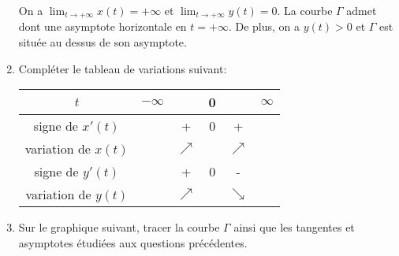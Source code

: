 \documentclass[a4paper]{tp_um}
\begin{document}
\begin{enumerate}
            On a $\lim_{t\to +\infty} x(t) = +\infty$ et $\lim_{t\to +\infty} y(t) = 0 $. La courbe $\Gamma$ admet dont une asymptote horizontale en $t=+\infty$. De plus, on a $y(t) >0$ et $\Gamma$ est située au dessus de son asymptote.
		\item Compléter le tableau de variations suivant:
			\begin{center}
				\begin{tabular}{|c|ccccc|}
					\hline    $t$       & $-\infty$ & \hspace{5cm}   &  0 &  \hspace{5cm} & $\infty$ \\[0.3cm]\hline\hline
					signe de $x'(t)$    &           &      +          &  0   &   +                 &          \\[0.4cm]\hline
       			 variation de $x(t)$    &           &      $\nearrow$          &    &        $\nearrow$         &     	 \\[0.9cm]\hline\hline
					signe de $y'(t)$    &           &      +          &  0  &     -               &          \\[0.4cm]\hline
					variation de $y(t)$ &           &      $\nearrow$          &    &   $\searrow$              &          \\[0.9cm]\hline
				\end{tabular}
			\end{center}
		\item  Sur le graphique suivant, tracer la courbe $\Gamma$ ainsi que les tangentes et asymptotes étudiées aux questions précédentes. 
                    \begin{center}
                    \end{center}

	\end{enumerate}
 
\end{document}
